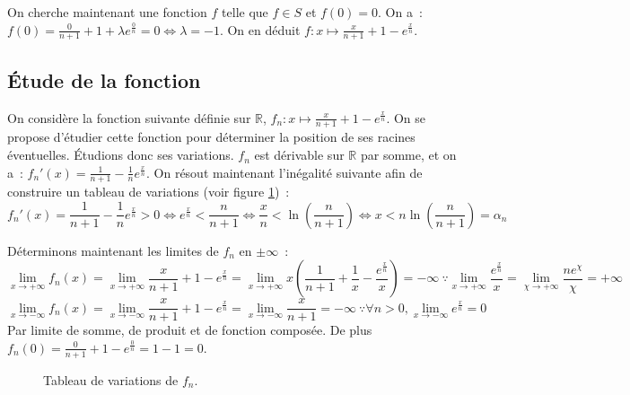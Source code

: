 \documentclass{article}
\begin{document}
  On cherche maintenant une fonction $f$ telle que $f\in S$ et $f(0)=0$. On a~: $f(0)=\frac{0}{n+1}+1+\lambda e^\frac{0}{n}=0\iff\lambda=-1$. On en déduit $f:x\mapsto \frac{x}{n+1}+1-e^\frac{x}{n}$.

  \subsection{Étude de la fonction}
  On considère la fonction suivante définie sur $\mathbb{R}$, $f_n:x\mapsto \frac{x}{n+1}+1-e^\frac{x}{n}$. On se propose d'étudier cette fonction pour déterminer la position de ses racines éventuelles. Étudions donc ses variations. $f_n$ est dérivable sur $\mathbb{R}$ par somme, et on a~: $f_n'(x)=\frac{1}{n+1}-\frac{1}{n}e^\frac{x}{n}$. On résout maintenant l'inégalité suivante afin de construire un tableau de variations (voir figure \ref{varfn})~:
  \begin{displaymath}
    f_n'(x)=\frac{1}{n+1}-\frac{1}{n}e^\frac{x}{n}>0\iff e^\frac{x}{n}<\frac{n}{n+1}\iff\frac{x}{n}<\ln\left(\frac{n}{n+1}\right)\iff x<n\ln\left(\frac{n}{n+1}\right)=\alpha_n
  \end{displaymath}

  Déterminons maintenant les limites de $f_n$ en $\pm\infty$~:
  \begin{displaymath}
    \lim_{x\to +\infty}f_n(x)=\lim_{x\to +\infty}\frac{x}{n+1}+1-e^\frac{x}{n}=\lim_{x\to +\infty}x\left(\frac{1}{n+1}+\frac{1}{x}-\frac{e^\frac{x}{n}}{x}\right)=-\infty\ \because\lim_{x\to +\infty}\frac{e^\frac{x}{n}}{x}=\lim_{\chi\to +\infty}\frac{ne^\chi}{\chi}=+\infty
  \end{displaymath}
  \begin{displaymath}
    \lim_{x\to -\infty}f_n(x)=\lim_{x\to -\infty}\frac{x}{n+1}+1-e^\frac{x}{n}=\lim_{x\to -\infty}\frac{x}{n+1}=-\infty\ \because\forall n> 0,\lim_{x\to -\infty}e^\frac{x}{n}=0
  \end{displaymath}
  Par limite de somme, de produit et de fonction composée. De plus $f_n(0)=\frac{0}{n+1}+1-e^\frac{0}{n}=1-1=0$.

  \begin{figure}[h]
   \begin{center}
   \end{center}
   \caption{Tableau de variations de $f_n$.}
   \label{varfn}
  \end{figure}
\end{document}
